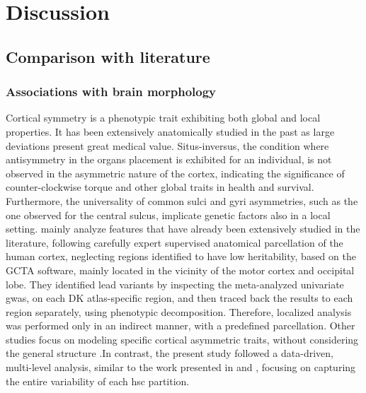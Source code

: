 \chapter{Discussion}\label{chap:discussion}

\section{Comparison with literature}
\subsection{Associations with brain morphology}
\label{sec:lit_discussion}
Cortical symmetry is a phenotypic trait exhibiting both global and local properties. It has been extensively anatomically studied in the past as large deviations present great medical value. Situs-inversus, the condition where antisymmetry in the organs placement is exhibited for an individual, is not observed in the asymmetric nature of the cortex, indicating the significance of counter-clockwise torque and other global traits in health and survival. Furthermore, the universality of common sulci and gyri asymmetries, such as the one observed for the central sulcus, implicate genetic factors also in a local setting.  \citet{Sha2021} mainly analyze features that have already been extensively studied in the literature, following carefully expert supervised anatomical parcellation of the human cortex, neglecting regions identified to have low heritability, based on the GCTA software, mainly located in the vicinity of the motor cortex and occipital lobe. They identified lead variants by inspecting the meta-analyzed univariate \ac{gwas}, on each DK atlas-specific region, and then traced back the results to each region separately, using phenotypic decomposition\cite{Lin2020}. Therefore, localized analysis was performed only in an indirect manner, with a predefined parcellation. Other studies focus on modeling specific cortical asymmetric traits, without considering the general structure \cite{Kong2018,Kong2021,Zhao2022}.In contrast, the present study followed a data-driven, multi-level analysis, similar to the work presented in \cite{Naqvi2021} and \cite{Claes2018}, focusing on capturing the entire variability of each  \ac{hsc} partition. 

